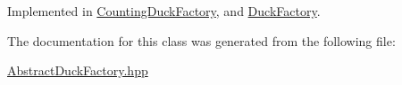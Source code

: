Implemented in \hyperlink{classCountingDuckFactory_a82e9b5dfa34f030d5a6c23e5c8b8a461}{Counting\-Duck\-Factory}, and \hyperlink{classDuckFactory_a90660d3ac9c71f0882fcce1209d811ed}{Duck\-Factory}.



The documentation for this class was generated from the following file\-:\begin{DoxyCompactItemize}
\item 
\hyperlink{AbstractDuckFactory_8hpp}{Abstract\-Duck\-Factory.\-hpp}\end{DoxyCompactItemize}
